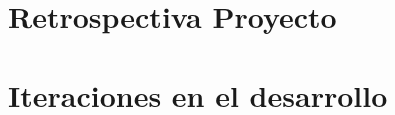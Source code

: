 \documentclass[final,letterpaper,oneside,authoryear,11pt,singlespace,spanish]{ezthesis}
\begin{document}


\section{Retrospectiva Proyecto}
\label{anexo:retrospectiva} 


\section{Iteraciones en el desarrollo}
\label{anexo:iteraciones}

\end{document}
